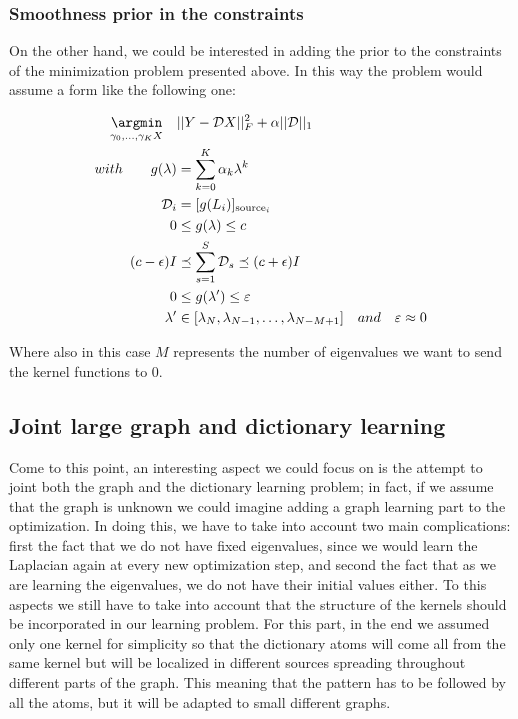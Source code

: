 \subsubsection{Smoothness prior in the constraints}
On the other hand, we could be interested in adding the prior to the constraints of the minimization problem presented above. In this way the problem would assume a form like the following one:

\begin{align}
\underset{{\gamma_0,\dots,\gamma_{K}X}}{\argmin} \quad& ||Y - \mathcal{D}X||^2_F + \alpha||\mathcal{D}||_1 \label{eq:optConstraint}\\
with \qquad g(\lambda) &= \sum_{k=0}^{K}\alpha_k\lambda^{k} \notag\\
\mathcal{D}_i &= [g(L_i)]_{\text{source}_i} \notag\\
0 &\leq g(\lambda) \leq c \label{eq:ProblemPresConstraint1}\\
(c-\epsilon)I &\preceq \sum_{s=1}^{S}\mathcal{D}_s \preceq (c+\epsilon)I \notag\\
0 & \leq g(\lambda') \leq \varepsilon \notag\\
\lambda' & \in [\lambda_{N}, \lambda_{N-1},\dots,\lambda_{N-M+1}] \quad and \quad \varepsilon \approx 0 \label{eq:ProblemPresConstraint2}
\end{align}

Where also in this case $M$ represents the number of eigenvalues we want to send the kernel functions to 0.

\subsection{Joint large graph and dictionary learning}
Come to this point, an interesting aspect we could focus on is the attempt to joint both the graph and the dictionary learning problem; in fact, if we assume that the graph is unknown we could imagine adding a graph learning part to the optimization. In doing this, we have to take into account two main complications: first the fact that we do not have fixed eigenvalues, since we would learn the Laplacian again at every new optimization step, and second the fact that as we are learning the eigenvalues, we do not have their initial values either. To this aspects we still have to take into account that the structure of the kernels should be incorporated in our learning problem. For this part, in the end we assumed only one kernel for simplicity so that the dictionary atoms will come all from the same kernel but will be localized in different sources spreading throughout different parts of the graph. This meaning that the pattern has to be followed by all the atoms, but it will be adapted to small different graphs.

